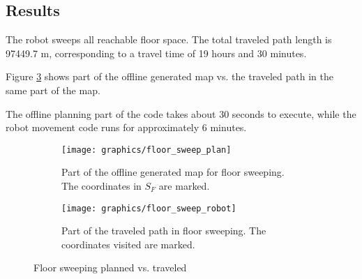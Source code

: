 \subsection{Results}
The robot sweeps all reachable floor space.
The total traveled path length is 97449.7 m, corresponding to a travel time of 19 hours and 30 minutes.

Figure \ref{floor_sweeping_results} shows part of the offline generated map vs. the traveled path in the same part of the map.

The offline planning part of the code takes about 30 seconds to execute,
while the robot movement code runs for approximately 6 minutes.

\begin{figure}[ht]
\centering
  \begin{subfigure}[t]{0.3\textwidth}
    \texttt{[image: graphics/floor\_sweep\_plan]}
    \caption{Part of the offline generated map for floor sweeping. The coordinates in \(S_{F}\) are marked.}
    \label{floor_sweep_plan}
  \end{subfigure}
  \begin{subfigure}[t]{0.3\textwidth}
    \texttt{[image: graphics/floor\_sweep\_robot]}
    \caption{Part of the traveled path in floor sweeping. The coordinates visited are marked.}
    \label{floor_sweep_robot}
  \end{subfigure}
\caption{Floor sweeping planned vs. traveled}
\label{floor_sweeping_results}
\end{figure}